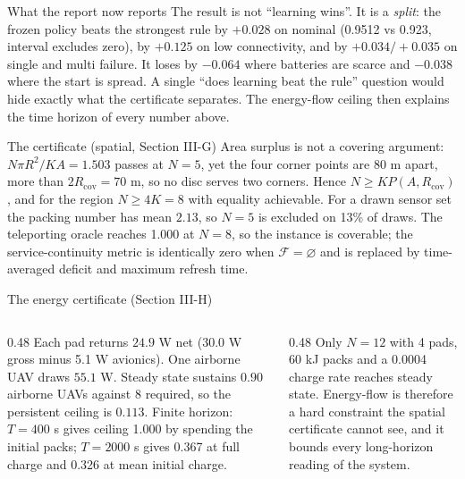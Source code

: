 \documentclass[aspectratio=169,10pt]{beamer}
\begin{document}
\begin{frame}{What the report now reports}
  \small
  The result is not ``learning wins''. It is a \textit{split}: the frozen policy beats the strongest rule by $+0.028$ on nominal (0.9512 vs 0.923, interval excludes zero), by $+0.125$ on low connectivity, and by $+0.034/+0.035$ on single and multi failure. It loses by $-0.064$ where batteries are scarce and $-0.038$ where the start is spread. A single ``does learning beat the rule'' question would hide exactly what the certificate separates. The energy-flow ceiling then explains the time horizon of every number above.
\end{frame}

\begin{frame}{The certificate (spatial, Section III-G)}
  \small
  Area surplus is not a covering argument: $N\pi R^2/KA = 1.503$ passes at $N=5$, yet the four corner points are $80$ m apart, more than $2R_{\mathrm{cov}}=70$ m, so no disc serves two corners. Hence $N\ge K P(A,R_{\mathrm{cov}})$, and for the region $N\ge 4K=8$ with equality achievable. For a drawn sensor set the packing number has mean $2.13$, so $N=5$ is excluded on 13\% of draws. The teleporting oracle reaches 1.000 at $N=8$, so the instance is coverable; the service-continuity metric is identically zero when $\mathcal{F}=\varnothing$ and is replaced by time-averaged deficit and maximum refresh time.
\end{frame}

\begin{frame}{The energy certificate (Section III-H)}
  \small
  \begin{columns}
    \begin{column}{0.48\textwidth}
      Each pad returns $24.9$ W net (30.0 W gross minus 5.1 W avionics). One airborne UAV draws $55.1$ W. Steady state sustains $0.90$ airborne UAVs against 8 required, so the persistent ceiling is $0.113$. Finite horizon: $T=400$ s gives ceiling 1.000 by spending the initial packs; $T=2000$ s gives 0.367 at full charge and 0.326 at mean initial charge.
    \end{column}
    \begin{column}{0.48\textwidth}
      Only $N=12$ with 4 pads, 60 kJ packs and a 0.0004 charge rate reaches steady state. Energy-flow is therefore a hard constraint the spatial certificate cannot see, and it bounds every long-horizon reading of the system.
    \end{column}
  \end{columns}
\end{frame}
\end{document}
